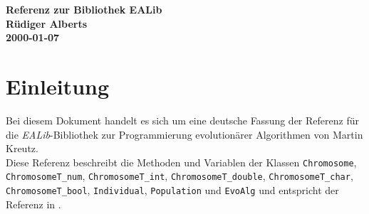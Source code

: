 \documentclass{report}
\begin{document}
\setCorrectWidthOne{-6pt}
\setCorrectWidthTwo{-2pt}
\setCorrectWidthThree{4pt}
\setVertSpace{4pt}
\setNormalInstance

\begin{center}
    {\Large {\bf Referenz zur Bibliothek EALib}}\\
    {\bf R\"udiger Alberts}\\
    {\bf 2000-01-07}
\end{center}

\tableofcontents

\newpage
\noindent
\chapter{Einleitung}
Bei diesem Dokument handelt es sich um eine deutsche Fassung der
Referenz f\"ur die {\em EALib}-Bibliothek zur
Programmierung evolution\"arer Algorithmen von Martin Kreutz.\\
Diese Referenz beschreibt die Methoden und Variablen der Klassen
{\tt Chromosome}, {\tt ChromosomeT\_num}, {\tt ChromosomeT\_int},
{\tt ChromosomeT\_double}, {\tt ChromosomeT\_char}, \\
{\tt ChromosomeT\_bool}, {\tt Individual}, {\tt Population} und
{\tt EvoAlg} und entspricht der Referenz in \cite{EALib}.


\newpage

\noindent
\end{document}
